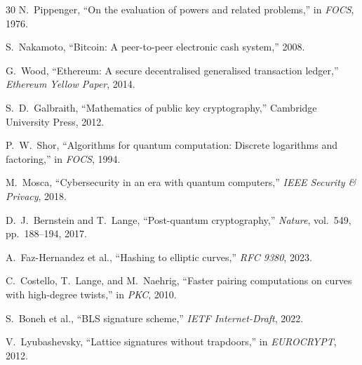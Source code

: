 \documentclass[11pt,a4paper]{article}
\begin{document}
\begin{thebibliography}{30}
N.~Pippenger, ``On the evaluation of powers and related problems,'' in \emph{FOCS}, 1976.

S.~Nakamoto, ``Bitcoin: A peer-to-peer electronic cash system,'' 2008.

G.~Wood, ``Ethereum: A secure decentralised generalised transaction ledger,'' \emph{Ethereum Yellow Paper}, 2014.

S.~D.~Galbraith, ``Mathematics of public key cryptography,'' Cambridge University Press, 2012.

P.~W.~Shor, ``Algorithms for quantum computation: Discrete logarithms and factoring,'' in \emph{FOCS}, 1994.

M.~Mosca, ``Cybersecurity in an era with quantum computers,'' \emph{IEEE Security \& Privacy}, 2018.

D.~J.~Bernstein and T.~Lange, ``Post-quantum cryptography,'' \emph{Nature}, vol.~549, pp.~188--194, 2017.

A.~Faz-Hernandez et al., ``Hashing to elliptic curves,'' \emph{RFC 9380}, 2023.

C.~Costello, T.~Lange, and M.~Naehrig, ``Faster pairing computations on curves with high-degree twists,'' in \emph{PKC}, 2010.

S.~Boneh et al., ``BLS signature scheme,'' \emph{IETF Internet-Draft}, 2022.

V.~Lyubashevsky, ``Lattice signatures without trapdoors,'' in \emph{EUROCRYPT}, 2012.

\end{thebibliography}
\end{document}
